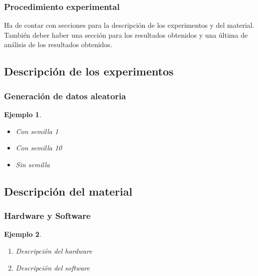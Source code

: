 \documentclass{beamer}
\newtheorem{ejemplo}{Ejemplo}
\begin{document}
\begin{frame}
\frametitle{Procedimiento experimental}

Ha de contar con secciones para la descripción de los experimentos y del material.
También deber haber una sección para los resultados obtenidos y una última de
análisis de los resultados obtenidos.

\end{frame}

\subsection{Descripción de los experimentos}

\begin{frame}
\frametitle{Generación de datos aleatoria}

\begin{ejemplo}
  \begin{itemize}
    \item <1-> Con semilla 1 
    \item <2-> Con semilla 10 
    \item <3> Sin semilla 
  \end{itemize}
\end{ejemplo}

\end{frame}

\subsection{Descripción del material}
\begin{frame}
\frametitle{Hardware y Software}

\begin{ejemplo}
  \begin{enumerate}
    \item
      Descripción del hardware 
      \pause

    \item
      Descripción del software 
  \end{enumerate}
\end{ejemplo}

\end{frame}
\end{document}
